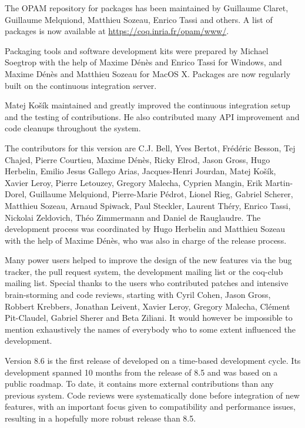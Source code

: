 The OPAM repository for {\Coq} packages has been maintained by Guillaume
Claret, Guillaume Melquiond, Matthieu Sozeau, Enrico Tassi and others. A
list of packages is now available at \url{https://coq.inria.fr/opam/www/}.

Packaging tools and software development kits were prepared by Michael
Soegtrop with the help of Maxime Dénès and Enrico Tassi for Windows, and
Maxime Dénès and Matthieu Sozeau for MacOS X. Packages are now regularly
built on the continuous integration server.

Matej Košík maintained and greatly improved the continuous integration
setup and the testing of {\Coq} contributions. He also contributed many
API improvement and code cleanups throughout the system.

The contributors for this version are C.J. Bell, Yves Bertot, Frédéric
Besson, Tej Chajed, Pierre Courtieu, Maxime Dénès, Ricky Elrod, Jason
Gross, Hugo Herbelin, Emilio Jesus Gallego Arias, Jacques-Henri Jourdan,
Matej Košík, Xavier Leroy, Pierre Letouzey, Gregory Malecha, Cyprien
Mangin, Erik Martin-Dorel, Guillaume Melquiond, Pierre-Marie Pédrot,
Lionel Rieg, Gabriel Scherer, Matthieu Sozeau, Arnaud Spiwack, Paul
Steckler, Laurent Théry, Enrico Tassi, Nickolai Zeldovich, Théo
Zimmermann and Daniel de Rauglaudre. The development process was
coordinated by Hugo Herbelin and Matthieu Sozeau with the help of
Maxime Dénès, who was also in charge of the release process.

Many power users helped to improve the design of the new features via
the bug tracker, the pull request system, the {\Coq} development mailing
list or the coq-club mailing list. Special thanks to the users who
contributed patches and intensive brain-storming and code reviews,
starting with Cyril Cohen, Jason Gross, Robbert Krebbers, Jonathan
Leivent, Xavier Leroy, Gregory Malecha, Clément Pit-Claudel, Gabriel
Sherer and Beta Ziliani. It would however be impossible to mention
exhaustively the names of everybody who to some extent influenced the
development.

Version 8.6 is the first release of {\Coq} developed on a time-based
development cycle. Its development spanned 10 months from the release of
{\Coq} 8.5 and was based on a public roadmap. To date, it contains more
external contributions than any previous {\Coq} system. Code reviews
were systematically done before integration of new features, with an
important focus given to compatibility and performance issues, resulting
in a hopefully more robust release than {\Coq} 8.5.

